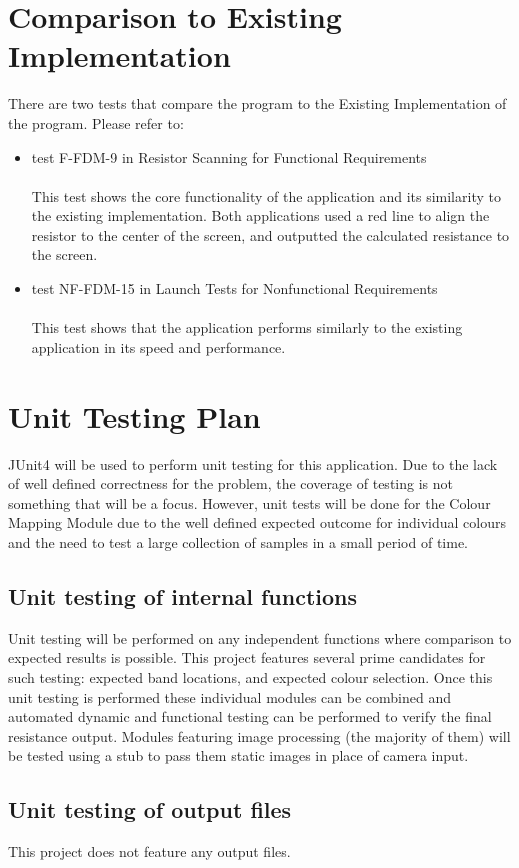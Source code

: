 \documentclass[12pt, titlepage]{article}
\begin{document}
\section{Comparison to Existing Implementation}
There are two tests that compare the program to the Existing Implementation of the program. Please refer to:
\begin{itemize}
\item test F-FDM-9 in Resistor Scanning for Functional Requirements\\
\\
This test shows the core functionality of the application and its similarity to the existing implementation. Both applications used a red line to align the resistor to the center of the screen, and outputted the calculated resistance to the screen.
\\
\item test NF-FDM-15 in Launch Tests for Nonfunctional Requirements\\
\\
This test shows that the application performs similarly to the existing application in its speed and performance.
\end{itemize}

\section{Unit Testing Plan}	
\par JUnit4 will be used to perform unit testing for this application. Due to the lack of well defined correctness for the problem, the coverage of testing is not something that will be a focus. However, unit tests will be done for the Colour Mapping Module due to the well defined expected outcome for individual colours and the need to test a large collection of samples in a small period of time.
\subsection{Unit testing of internal functions}
\par Unit testing will be performed on any independent functions where comparison to expected results is possible. This project features several prime candidates for such testing: expected band locations, and expected colour selection. Once this unit testing is performed these individual modules can be combined and automated dynamic and functional testing can be performed to verify the final resistance output. Modules featuring image processing (the majority of them) will be tested using a stub to pass them static images in place of camera input.
\subsection{Unit testing of output files}		
\par This project does not feature any output files.


\end{document}

